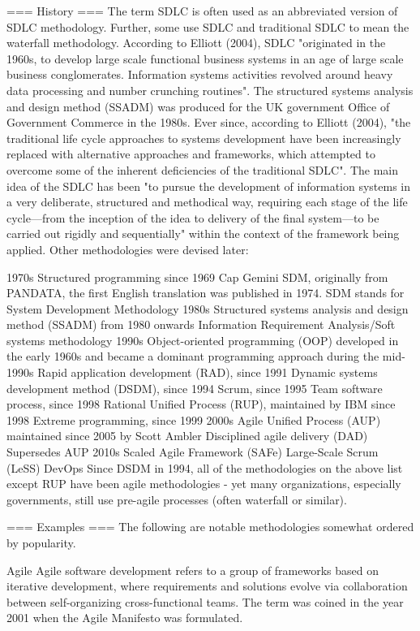 === History ===
The term SDLC is often used as an abbreviated version of SDLC methodology. Further, some use SDLC and traditional SDLC to mean the waterfall methodology.
According to Elliott (2004), SDLC "originated in the 1960s, to develop large scale functional business systems in an age of large scale business conglomerates. Information systems activities revolved around heavy data processing and number crunching routines". The structured systems analysis and design method (SSADM) was produced for the UK government Office of Government Commerce in the 1980s. Ever since, according to Elliott (2004), "the traditional life cycle approaches to systems development have been increasingly replaced with alternative approaches and frameworks, which attempted to overcome some of the inherent deficiencies of the traditional SDLC". The main idea of the SDLC has been "to pursue the development of information systems in a very deliberate, structured and methodical way, requiring each stage of the life cycle––from the inception of the idea to delivery of the final system––to be carried out rigidly and sequentially" within the context of the framework being applied.
Other methodologies were devised later:

1970s
Structured programming since 1969
Cap Gemini SDM, originally from PANDATA, the first English translation was published in 1974. SDM stands for System Development Methodology
1980s
Structured systems analysis and design method (SSADM) from 1980 onwards
Information Requirement Analysis/Soft systems methodology
1990s
Object-oriented programming (OOP) developed in the early 1960s and became a dominant programming approach during the mid-1990s
Rapid application development (RAD), since 1991
Dynamic systems development method (DSDM), since 1994
Scrum, since 1995
Team software process, since 1998
Rational Unified Process (RUP), maintained by IBM since 1998
Extreme programming, since 1999
2000s
Agile Unified Process (AUP) maintained since 2005 by Scott Ambler
Disciplined agile delivery (DAD) Supersedes AUP
2010s
Scaled Agile Framework (SAFe)
Large-Scale Scrum (LeSS)
DevOps
Since DSDM in 1994, all of the methodologies on the above list except RUP have been agile methodologies - yet many organizations, especially governments, still use pre-agile processes (often waterfall or similar). 


=== Examples ===
The following are notable methodologies somewhat ordered by popularity.

Agile
Agile software development refers to a group of frameworks based on iterative development, where requirements and solutions evolve via collaboration between self-organizing cross-functional teams. The term was coined in the year 2001 when the Agile Manifesto was formulated.

